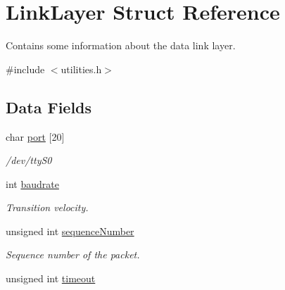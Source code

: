 \hypertarget{struct_link_layer}{\section{Link\-Layer Struct Reference}
\label{struct_link_layer}
}


Contains some information about the data link layer.  




{\ttfamily \#include $<$utilities.\-h$>$}

\subsection*{Data Fields}
\begin{DoxyCompactItemize}
\item 
\hypertarget{struct_link_layer_a0039909ad31932ecb4f823209dc8d673}{char \hyperlink{struct_link_layer_a0039909ad31932ecb4f823209dc8d673}{port} \mbox{[}20\mbox{]}}\label{struct_link_layer_a0039909ad31932ecb4f823209dc8d673}

\begin{DoxyCompactList}\small\item\em /dev/tty\-S0 \end{DoxyCompactList}\item 
\hypertarget{struct_link_layer_a513ce28a23cc7740b2444c0f1fc671c1}{int \hyperlink{struct_link_layer_a513ce28a23cc7740b2444c0f1fc671c1}{baudrate}}\label{struct_link_layer_a513ce28a23cc7740b2444c0f1fc671c1}

\begin{DoxyCompactList}\small\item\em Transition velocity. \end{DoxyCompactList}\item 
\hypertarget{struct_link_layer_a2a181002fca43efafda1fce8601b7f94}{unsigned int \hyperlink{struct_link_layer_a2a181002fca43efafda1fce8601b7f94}{sequence\-Number}}\label{struct_link_layer_a2a181002fca43efafda1fce8601b7f94}

\begin{DoxyCompactList}\small\item\em Sequence number of the packet. \end{DoxyCompactList}\item 
\hypertarget{struct_link_layer_a7f87c6463bd3633e2e75f12628f35410}{unsigned int \hyperlink{struct_link_layer_a7f87c6463bd3633e2e75f12628f35410}{timeout}}\label{struct_link_layer_a7f87c6463bd3633e2e75f12628f35410}


\end{DoxyCompactItemize}
